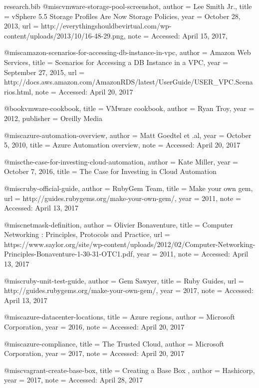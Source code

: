 \documentclass{article}
\begin{document}
\begin{filecontents*}{research.bib}
	@misc{vmware-storage-pool-screenshot,
		author  = {Lee Smith Jr.},
		title   = {vSphere 5.5 Storage Profiles Are Now Storage Policies},
		year    = {October 28, 2013},
		url     = {http://everythingshouldbevirtual.com/wp-content/uploads/2013/10/16-48-29.png},
		note = {Accessed: April 15, 2017},
	}

	@misc{amazon-scenarios-for-accessing-db-instance-in-vpc,
		author = {Amazon Web Services},
		title = {Scenarios for Accessing a DB Instance in a VPC},
		year = {September 27, 2015},
		url = {http://docs.aws.amazon.com/AmazonRDS/latest/UserGuide/USER_VPC.Scenarios.html},
		note = {Accessed: April 20, 2017}
	}

	@book{vmware-cookbook,
		title = {VMware cookbook},
		author = {Ryan Troy},
		year = {2012},
		publisher = {Oreilly Media}
	}

	@misc{azure-automation-overview,
		author = {Matt Goedtel et .al},
		year = {October 5, 2010},
		title = {Azure Automation overview},
		note = {Accessed: April 20, 2017}
	}

	@misc{the-case-for-investing-cloud-automation,
		author = {Kate Miller},
		year = {October 7, 2016},
		title = {The Case for Investing in Cloud Automation}
	}

    @misc{ruby-official-guide,
		author = {RubyGem Team},
		title = {Make your own gem},
		url = {http://guides.rubygems.org/make-your-own-gem/},
		year = {2011},
		note = {Accessed: April 13, 2017}
	}

	@misc{netmask-definition,
		author = {Olivier Bonaventure},
		title = {Computer Networking : Principles, Protocols and Practice},
		url = {https://www.saylor.org/site/wp-content/uploads/2012/02/Computer-Networking-Principles-Bonaventure-1-30-31-OTC1.pdf},
		year = {2011},
		note = {Accessed: April 13, 2017}
	}

	@misc{ruby-unit-test-guide,
		author = {Gem Sawyer},
		title = {Ruby Guides},
		url = {http://guides.rubygems.org/make-your-own-gem/},
		year = {2017},
		note = {Accessed: April 13, 2017}
	}

	@misc{azure-datacenter-locations,
		title = {Azure regions},
		author = {Microsoft Corporation},
		year = {2016},
		note = {Accessed: April 20, 2017}
	}

	@misc{azure-compliance,
		title = {The Trusted Cloud},
		author = {Microsoft Corporation},
		year = {2017},
		note = {Accessed: April 20, 2017}
	}

	@misc{vagrant-create-base-box,
		title = {Creating a Base Box },
		author = {Hashicorp},
		year = {2017},
		note = {Accessed: April 28, 2017}
	}


\end{filecontents*}
\end{document}
